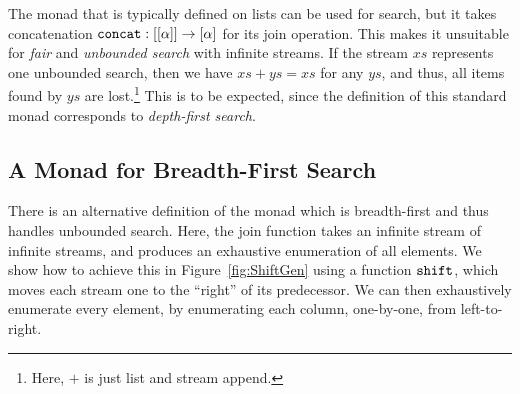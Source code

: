 The monad that is typically defined on lists can be used for search, but it takes concatenation $\texttt{concat} : [[\alpha]] \rightarrow [\alpha]$ for its join operation. This makes it unsuitable for \emph{fair} and \emph{unbounded search} with infinite streams. If the stream $xs$ represents one unbounded search, then we have $xs + ys = xs$ for any $ys$, and thus, all items found by $ys$ are lost.\footnote{Here, $+$ is just list and stream append.} This is to be expected, since the definition of this standard monad corresponds to \emph{depth-first search}. 

\subsection{A Monad for Breadth-First Search}\label{sec:StreamMonad}
There is an alternative definition of the monad which is breadth-first and thus handles unbounded search. Here, the join function takes an infinite stream of infinite streams, and produces an exhaustive enumeration of all elements. We show how to achieve this in Figure~\ref{fig:ShiftGen} using a function $\texttt{shift}$, which moves each stream one to the ``right'' of its predecessor. We can then exhaustively enumerate every element, by enumerating each column, one-by-one, from left-to-right. 

